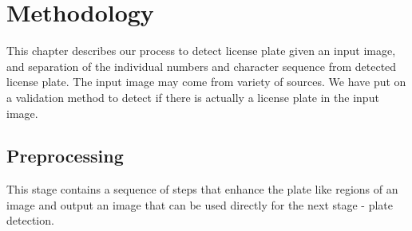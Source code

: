 \documentclass{standalone}
\begin{document}
\chapter{Methodology}
This chapter describes our process to detect license plate given an input image, and separation of the individual numbers and character sequence from detected license plate. The input image may come from variety of sources. We have put on a validation method to detect if there is actually a license plate in the input image.

  
  

\section{Preprocessing}
This stage contains a sequence of steps that enhance the plate like regions of an image and output an image that can be used directly for the next stage - plate detection.

  
  
  
  
  
  
  


  
  
  
  
  




\end{document}
